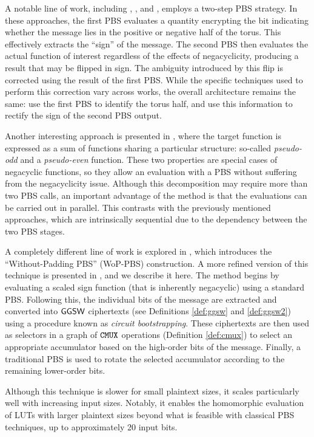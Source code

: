 A notable line of work, including \cite{EPRINT:YXSCZ21}, \cite{AC:LiuMicPol22}, and \cite{TCHES:KluSch23}, employs a two-step PBS strategy. In these approaches, the first PBS evaluates a quantity  encrypting the bit indicating whether the message lies in the positive or negative half of the torus. This effectively extracts the ``sign'' of the message. The second PBS then evaluates the actual function of interest regardless of the effects of negacyclicity, producing a result that may be flipped in sign. The ambiguity introduced by this flip is corrected using the result of the first PBS. While the specific techniques used to perform this correction vary across works, the overall architecture remains the same: use the first PBS to identify the torus half, and use this information to rectify the sign of the second PBS output.

Another interesting approach is presented in \cite{AFRICACRYPT:CBSZ23}, where the target function is expressed as a sum of functions sharing a particular structure: so-called \textit{pseudo-odd} and a \textit{pseudo-even} function. These two properties are special cases of negacyclic functions, so they allow an evaluation with a PBS without suffering from the negacyclicity issue. Although this decomposition may require more than two PBS calls, an important advantage of the method is that the evaluations can be carried out in parallel. This contrasts with the previously mentioned approaches, which are intrinsically sequential due to the dependency between the two PBS stages.

A completely different line of work is explored in \cite{AC:CLOT21}, which introduces the “Without-Padding PBS” (WoP-PBS) construction. A more refined version of this technique is presented in \cite{JC:BBBCLO23}, and we describe it here. The method begins by evaluating a scaled sign function (that is inherently negacyclic) using a standard PBS. Following this, the individual bits of the message are extracted and converted into $\textsf{GGSW}$ ciphertexts (see Definitions \ref{def:ggsw} and \ref{def:ggsw2}) using a procedure known as \textit{circuit bootstrapping}. These ciphertexts are then used as selectors in a graph of $\texttt{CMUX}$ operations (Definition \ref{def:cmux}) to select an appropriate accumulator based on the high-order bits of the message. Finally, a traditional PBS is used to rotate the selected accumulator according to the remaining lower-order bits.

Although this technique is slower for small plaintext sizes, it scales particularly well with increasing input sizes. Notably, it enables the homomorphic evaluation of LUTs with larger plaintext sizes beyond what is feasible with classical PBS techniques, up to approximately 20 input bits.


